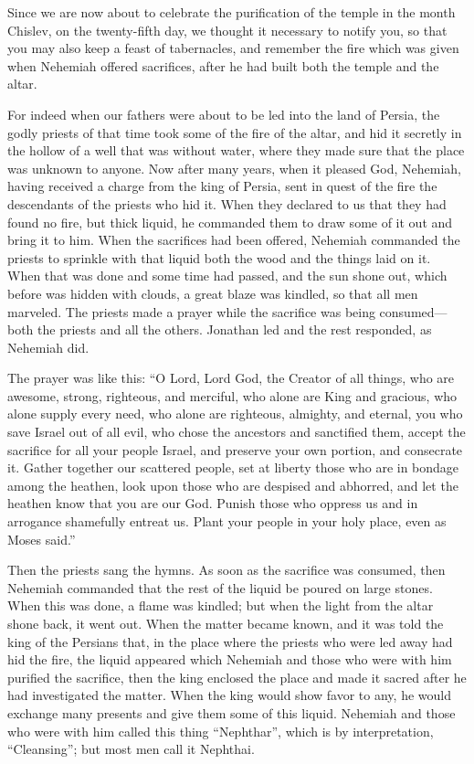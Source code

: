  Since we are now about to celebrate the purification of
the temple in the month Chislev, on the twenty-fifth day, we thought it
necessary to notify you, so that you may also keep a feast of
tabernacles, and remember the fire which was given when Nehemiah offered
sacrifices, after he had built both the temple and the altar.

 For indeed when our fathers were about to be led into
the land of Persia, the godly priests of that time took some of the fire
of the altar, and hid it secretly in the hollow of a well that was
without water, where they made sure that the place was unknown to
anyone.  Now after many years, when it pleased God,
Nehemiah, having received a charge from the king of Persia, sent in
quest of the fire the descendants of the priests who hid it. When they
declared to us that they had found no fire, but thick liquid,
 he commanded them to draw some of it out and bring it to
him. When the sacrifices had been offered, Nehemiah commanded the
priests to sprinkle with that liquid both the wood and the things laid
on it.  When that was done and some time had passed, and
the sun shone out, which before was hidden with clouds, a great blaze
was kindled, so that all men marveled.  The priests made
a prayer while the sacrifice was being consumed---both the priests and
all the others. Jonathan led and the rest responded, as Nehemiah did.

 The prayer was like this: ``O Lord, Lord God, the
Creator of all things, who are awesome, strong, righteous, and merciful,
who alone are King and gracious,  who alone supply every
need, who alone are righteous, almighty, and eternal, you who save
Israel out of all evil, who chose the ancestors and sanctified them,
 accept the sacrifice for all your people Israel, and
preserve your own portion, and consecrate it.  Gather
together our scattered people, set at liberty those who are in bondage
among the heathen, look upon those who are despised and abhorred, and
let the heathen know that you are our God.  Punish those
who oppress us and in arrogance shamefully entreat us. 
Plant your people in your holy place, even as Moses said.''

 Then the priests sang the hymns.  As soon
as the sacrifice was consumed, then Nehemiah commanded that the rest of
the liquid be poured on large stones.  When this was
done, a flame was kindled; but when the light from the altar shone back,
it went out.  When the matter became known, and it was
told the king of the Persians that, in the place where the priests who
were led away had hid the fire, the liquid appeared which Nehemiah and
those who were with him purified the sacrifice,  then the
king enclosed the place and made it sacred after he had investigated the
matter.  When the king would show favor to any, he would
exchange many presents and give them some of this liquid.
 Nehemiah and those who were with him called this thing
``Nephthar'', which is by interpretation, ``Cleansing''; but most men
call it Nephthai.

